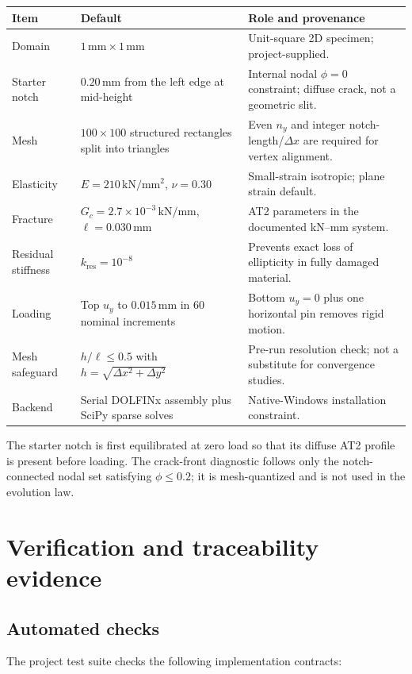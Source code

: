 \documentclass[11pt,a4paper]{article}
\begin{document}
\begin{tabularx}{\textwidth}{@{}L{47mm}L{45mm}Y@{}}
\toprule
\textbf{Item} & \textbf{Default} & \textbf{Role and provenance} \\
\midrule
Domain & $1\,\mathrm{mm}\times1\,\mathrm{mm}$ & Unit-square 2D specimen;
project-supplied. \\
Starter notch & $0.20\,\mathrm{mm}$ from the left edge at mid-height & Internal
nodal $\phi=0$ constraint; diffuse crack, not a geometric slit. \\
Mesh & $100\times100$ structured rectangles split into triangles & Even $n_y$
and integer notch-length/$\Delta x$ are required for vertex alignment. \\
Elasticity & $E=210\,\mathrm{kN/mm^2}$, $\nu=0.30$ & Small-strain isotropic;
plane strain default. \\
Fracture & $G_c=2.7\times10^{-3}\,\mathrm{kN/mm}$,
$\ell=0.030\,\mathrm{mm}$ & AT2 parameters in the documented kN--mm system. \\
Residual stiffness & $k_{\mathrm{res}}=10^{-8}$ & Prevents exact loss of
ellipticity in fully damaged material. \\
Loading & Top $u_y$ to $0.015\,\mathrm{mm}$ in 60 nominal increments & Bottom
$u_y=0$ plus one horizontal pin removes rigid motion. \\
Mesh safeguard & $h/\ell\le0.5$ with
$h=\sqrt{\Delta x^2+\Delta y^2}$ & Pre-run resolution check; not a substitute
for convergence studies. \\
Backend & Serial DOLFINx assembly plus SciPy sparse solves & Native-Windows
installation constraint. \\
\bottomrule
\end{tabularx}

The starter notch is first equilibrated at zero load so that its diffuse AT2
profile is present before loading. The crack-front diagnostic follows only the
notch-connected nodal set satisfying $\phi\le0.2$; it is mesh-quantized and is
not used in the evolution law.

\section{Verification and traceability evidence}

\subsection{Automated checks}

The project test suite checks the following implementation contracts:
\end{document}
